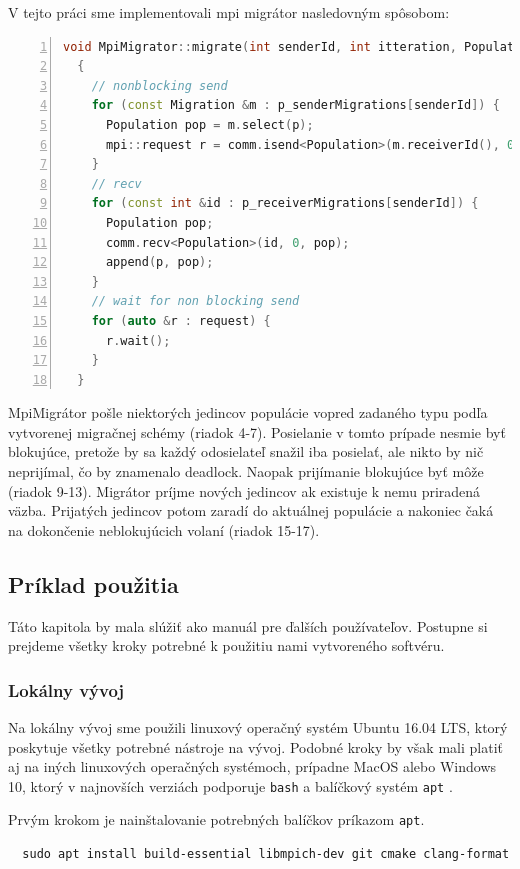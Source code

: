 V tejto práci sme implementovali \acrshort{mpi} migrátor nasledovným spôsobom:
\begin{lstlisting}[language=c++, caption={Kód MpiMigrator-a}, numbers={left}, label={lst:mpi-mig}]
  void MpiMigrator::migrate(int senderId, int itteration, Population &population)
  {
    // nonblocking send
    for (const Migration &m : p_senderMigrations[senderId]) {
      Population pop = m.select(p);
      mpi::request r = comm.isend<Population>(m.receiverId(), 0, pop);
    }
    // recv
    for (const int &id : p_receiverMigrations[senderId]) {
      Population pop;
      comm.recv<Population>(id, 0, pop);
      append(p, pop);
    }
    // wait for non blocking send
    for (auto &r : request) {
      r.wait();
    }
  }
\end{lstlisting}
MpiMigrátor pošle niektorých jedincov populácie vopred zadaného typu podľa vytvorenej migračnej schémy (riadok 4-7).
Posielanie v tomto prípade nesmie byť blokujúce, pretože by sa každý odosielateľ snažil iba posielať, ale nikto by nič neprijímal, čo by znamenalo deadlock.
Naopak prijímanie blokujúce byť môže (riadok 9-13). Migrátor príjme nových jedincov ak existuje k nemu priradená väzba.
Prijatých jedincov potom zaradí do aktuálnej populácie a nakoniec čaká na dokončenie neblokujúcich volaní (riadok 15-17).

\subsection{Príklad použitia}
Táto kapitola by mala slúžiť ako manuál pre ďalších používateľov.
Postupne si prejdeme všetky kroky potrebné k použitiu nami vytvoreného softvéru.

\subsubsection{Lokálny vývoj}
\label{subsec:local-dev}
Na lokálny vývoj sme použili linuxový operačný systém Ubuntu 16.04 LTS, ktorý poskytuje všetky potrebné nástroje na vývoj.
Podobné kroky by však mali platiť aj na iných linuxových operačných systémoch, prípadne MacOS alebo Windows 10,
ktorý v najnovších verziách podporuje \texttt{bash} a balíčkový systém \texttt{apt} \cite{bash-on-win}.

Prvým krokom je nainštalovanie potrebných balíčkov príkazom \texttt{apt}.
\begin{lstlisting}
  sudo apt install build-essential libmpich-dev git cmake clang-format
\end{lstlisting}

